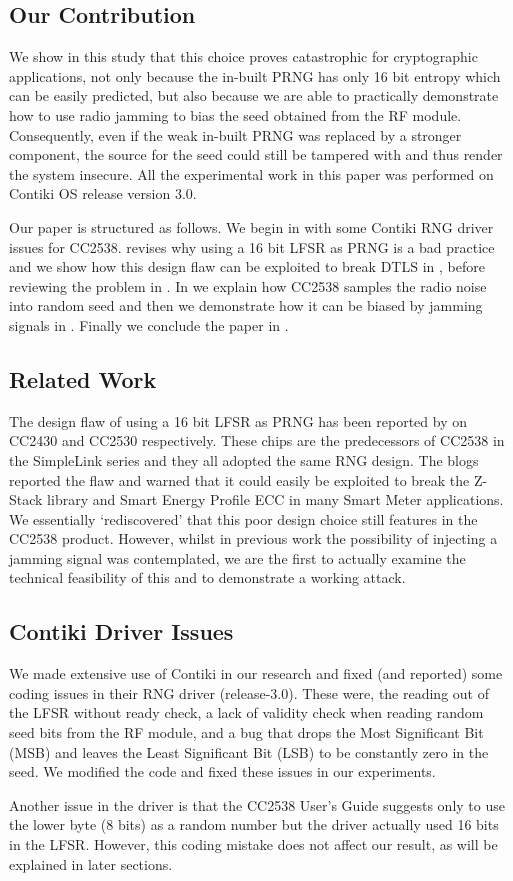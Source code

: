 \subsection{Our Contribution}
We show in this study that this choice proves catastrophic for cryptographic applications, not only because the in-built PRNG has only 16 bit entropy which can be easily predicted, but also because we are able to practically demonstrate how to use radio jamming to bias the seed obtained from the RF module. Consequently, even if the weak in-built PRNG was replaced by a stronger component, the source for the seed could still be tampered with and thus render the system insecure. All the experimental work in this paper was performed on Contiki OS\cite{Contiki} release version 3.0. 

Our paper is structured as follows. We begin in  with some Contiki RNG driver issues for CC2538.  revises why using a 16 bit LFSR as PRNG is a bad practice and we show how this design flaw can be exploited to break DTLS in , before reviewing the problem in . In  we explain how CC2538 samples the radio noise into random seed and then we demonstrate how it can be biased by jamming signals in . Finally we conclude the paper in .

\subsection{Related Work}
The design flaw of using a 16 bit LFSR as PRNG has been reported by \cite{SmartMeterBlog}\cite{CC2530PRNG} on CC2430\cite{CC2430Manual} and CC2530\cite{CC2530Manual} respectively. These chips are the predecessors of CC2538 in the SimpleLink\cite{SimpleLink} series and they all adopted the same RNG design. The blogs reported the flaw and warned that it could easily be exploited to break the Z-Stack library\cite{ZStack} and Smart Energy Profile ECC in many Smart Meter applications. We essentially `rediscovered' that this poor design choice still features in the CC2538 product. However, whilst in previous work the possibility of injecting a jamming signal was contemplated, we are the first to actually examine the technical feasibility of this and to demonstrate a working attack.


\subsection{Contiki Driver Issues}\label{ContikiDriverIssue}
We made extensive use of Contiki in our research and fixed (and reported) some coding issues in their RNG driver (release-3.0). These were, the reading out of the LFSR without ready check, a lack of validity check when reading random seed bits from the RF module, and a bug that drops the Most Significant Bit (MSB) and leaves the Least Significant Bit (LSB) to be constantly zero in the seed.  We modified the code and fixed these issues in our experiments. 

Another issue in the driver is that the CC2538 User's Guide\cite{CC2538Manual} suggests only to use the lower byte (8 bits) as a random number but the driver actually used 16 bits in the LFSR. However, this coding mistake does not affect our result, as will be explained in  later sections.